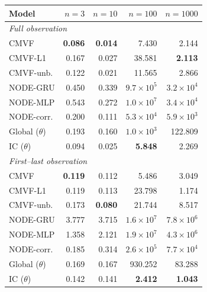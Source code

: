\begin{tabular}{lrrrr}
\toprule
Model & $n{=}3$ & $n{=}10$ & $n{=}100$ & $n{=}1000$ \\
\midrule
\multicolumn{5}{l}{\emph{Full observation}} \\
CMVF & \textbf{0.086} & \textbf{0.014} & 7.430 & 2.144 \\
CMVF-L1 & 0.167 & 0.027 & 38.581 & \textbf{2.113} \\
CMVF-unb. & 0.122 & 0.021 & 11.565 & 2.866 \\
NODE-GRU & 0.450 & 0.339 & $9.7\!\times\!10^{5}$ & $3.2\!\times\!10^{4}$ \\
NODE-MLP & 0.543 & 0.272 & $1.0\!\times\!10^{7}$ & $3.4\!\times\!10^{4}$ \\
NODE-corr. & 0.200 & 0.111 & $5.3\!\times\!10^{4}$ & $5.9\!\times\!10^{3}$ \\
Global ($\theta$) & 0.193 & 0.160 & $1.0\!\times\!10^{3}$ & 122.809 \\
IC ($\theta$) & 0.094 & 0.025 & \textbf{5.848} & 2.269 \\
\midrule
\multicolumn{5}{l}{\emph{First--last observation}} \\
CMVF & \textbf{0.119} & 0.112 & 5.486 & 3.049 \\
CMVF-L1 & 0.119 & 0.113 & 23.798 & 1.174 \\
CMVF-unb. & 0.173 & \textbf{0.080} & 21.744 & 8.517 \\
NODE-GRU & 3.777 & 3.715 & $1.6\!\times\!10^{7}$ & $7.8\!\times\!10^{6}$ \\
NODE-MLP & 1.358 & 2.121 & $1.9\!\times\!10^{7}$ & $4.3\!\times\!10^{6}$ \\
NODE-corr. & 0.185 & 0.314 & $2.6\!\times\!10^{5}$ & $7.7\!\times\!10^{4}$ \\
Global ($\theta$) & 0.169 & 0.167 & 930.252 & 83.288 \\
IC ($\theta$) & 0.142 & 0.141 & \textbf{2.412} & \textbf{1.043} \\
\bottomrule
\end{tabular}
